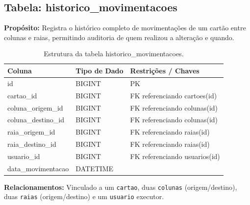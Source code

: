 \subsection{Tabela: historico\_movimentacoes}
\textbf{Propósito:} Registra o histórico completo de movimentações de um cartão entre colunas e raias, permitindo auditoria de quem realizou a alteração e quando.

\begin{table}[H]
    \centering
    \begin{tabular}{|l|l|p{8cm}|}
        \hline
        \textbf{Coluna} & \textbf{Tipo de Dado} & \textbf{Restrições / Chaves} \\
        \hline
        id & BIGINT & PK \\
        \hline
        cartao\_id & BIGINT & FK referenciando cartoes(id) \\
        \hline
        coluna\_origem\_id & BIGINT & FK referenciando colunas(id) \\
        \hline
        coluna\_destino\_id & BIGINT & FK referenciando colunas(id) \\
        \hline
        raia\_origem\_id & BIGINT & FK referenciando raias(id) \\
        \hline
        raia\_destino\_id & BIGINT & FK referenciando raias(id) \\
        \hline
        usuario\_id & BIGINT & FK referenciando usuarios(id) \\
        \hline
        data\_movimentacao & DATETIME & \\
        \hline
    \end{tabular}
    \caption{Estrutura da tabela historico\_movimentacoes.}
\end{table}
\noindent \textbf{Relacionamentos:} Vinculado a um \texttt{cartao}, duas \texttt{colunas} (origem/destino), duas \texttt{raias} (origem/destino) e um \texttt{usuario} executor.
